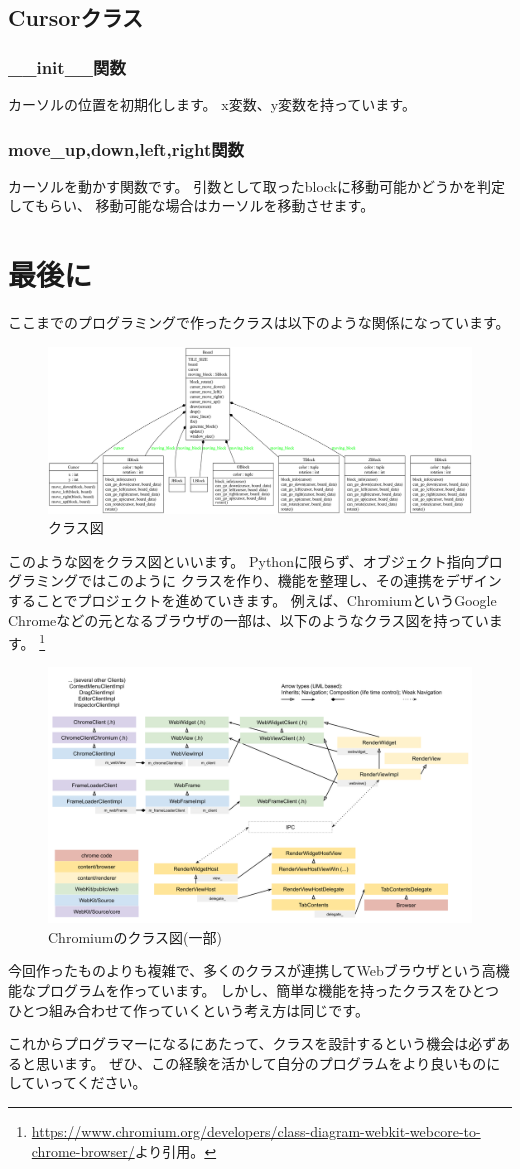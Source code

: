 \subsection{Cursorクラス}
\subsubsection{\_\_init\_\_関数}
カーソルの位置を初期化します。
x変数、y変数を持っています。

\subsubsection{move\_up,down,left,right関数}
カーソルを動かす関数です。
引数として取ったblockに移動可能かどうかを判定してもらい、
移動可能な場合はカーソルを移動させます。

\section{最後に}
ここまでのプログラミングで作ったクラスは以下のような関係になっています。
\begin{figure}
  [h]
  \centering
  \includegraphics[width=\textwidth]{images/classes_tetris.png}
  \caption{クラス図}
\end{figure}
このような図をクラス図といいます。
\newpage
Pythonに限らず、オブジェクト指向プログラミングではこのように
クラスを作り、機能を整理し、その連携をデザインすることでプロジェクトを進めていきます。
例えば、ChromiumというGoogle Chromeなどの元となるブラウザの一部は、以下のようなクラス図を持っています。
\footnote{\url{https://www.chromium.org/developers/class-diagram-webkit-webcore-to-chrome-browser/}より引用。}
\begin{figure}
  [h]
  \centering
  \includegraphics[width=\textwidth]{images/Chromium.png}
  \caption{Chromiumのクラス図(一部)}
\end{figure}
今回作ったものよりも複雑で、多くのクラスが連携してWebブラウザという高機能なプログラムを作っています。
しかし、簡単な機能を持ったクラスをひとつひとつ組み合わせて作っていくという考え方は同じです。

これからプログラマーになるにあたって、クラスを設計するという機会は必ずあると思います。
ぜひ、この経験を活かして自分のプログラムをより良いものにしていってください。